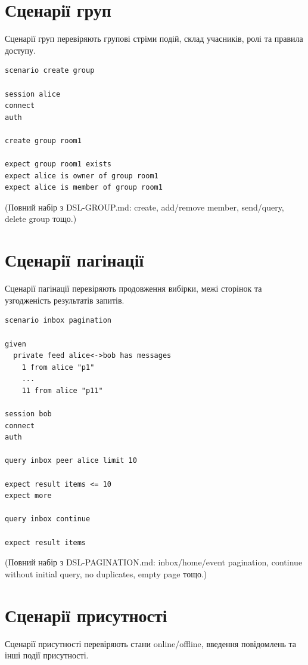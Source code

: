 \documentclass{article}
\begin{document}
\section{Сценарії груп}

Сценарії груп перевіряють групові стріми подій, склад учасників, ролі та правила доступу.

\begin{lstlisting}[language={},basicstyle=\ttfamily\small]
scenario create group

session alice
connect
auth

create group room1

expect group room1 exists
expect alice is owner of group room1
expect alice is member of group room1
\end{lstlisting}

(Повний набір з DSL-GROUP.md: create, add/remove member, send/query, delete group тощо.)

\section{Сценарії пагінації}

Сценарії пагінації перевіряють продовження вибірки, межі сторінок та узгодженість результатів запитів.

\begin{lstlisting}[language={},basicstyle=\ttfamily\small]
scenario inbox pagination

given
  private feed alice<->bob has messages
    1 from alice "p1"
    ...
    11 from alice "p11"

session bob
connect
auth

query inbox peer alice limit 10

expect result items <= 10
expect more

query inbox continue

expect result items
\end{lstlisting}

(Повний набір з DSL-PAGINATION.md: inbox/home/event pagination, continue without initial query, no duplicates, empty page тощо.)

\section{Сценарії присутності}

Сценарії присутності перевіряють стани online/offline, введення повідомлень та інші події присутності.
\end{document}
